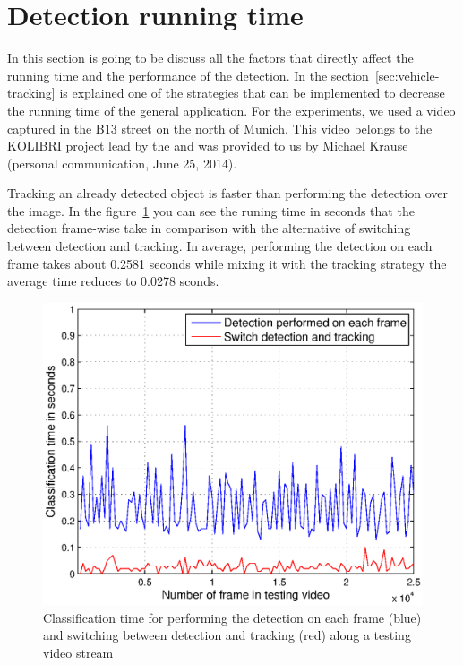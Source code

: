 
\section{Detection running time} %
\label{sec:running-time}

In this section is going to be discuss all the factors that directly affect the
running time and the performance of the detection. In the
section~\ref{sec:vehicle-tracking} is explained one of the strategies that can
be implemented to decrease the running time of the general application. For the
experiments, we used a video captured in the B13 street on the north of Munich.
This video belongs to the KOLIBRI project lead by the \cite{kolibri} and was provided to us by Michael Krause (personal communication, June 25, 2014).

Tracking an already detected object is faster than performing the detection over the
image. In the figure~\ref{fig:trackingvsdetection} you can see the runing time
in seconds that the detection frame-wise take in comparison with the alternative
of switching between detection and tracking. In average, performing the
detection on each frame takes about 0.2581 seconds while mixing it with the
tracking strategy the average time reduces to 0.0278 sconds.


\begin{figure}[h]
\centering
\includegraphics[width=\linewidth]{img/trackingvsdetection.eps}
\caption{Classification time for performing the detection on each
    frame (blue) and switching between detection and tracking (red) along a
    testing video stream}
\label{fig:trackingvsdetection}
\end{figure} 

